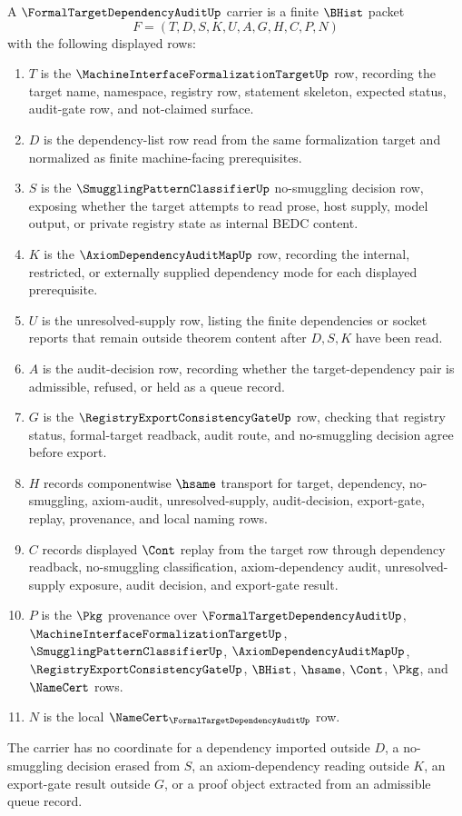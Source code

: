 \begin{definition}
\label{def:formal-target-dependency-audit-carrier}
A $\FormalTargetDependencyAuditUp$ carrier is a finite $\BHist$ packet
$$
F=(T,D,S,K,U,A,G,H,C,P,N)
$$
with the following displayed rows:
\begin{enumerate}
\item $T$ is the $\MachineInterfaceFormalizationTargetUp$ row, recording the target name, namespace, registry row, statement skeleton, expected status, audit-gate row, and not-claimed surface.
\item $D$ is the dependency-list row read from the same formalization target and normalized as finite machine-facing prerequisites.
\item $S$ is the $\SmugglingPatternClassifierUp$ no-smuggling decision row, exposing whether the target attempts to read prose, host supply, model output, or private registry state as internal BEDC content.
\item $K$ is the $\AxiomDependencyAuditMapUp$ row, recording the internal, restricted, or externally supplied dependency mode for each displayed prerequisite.
\item $U$ is the unresolved-supply row, listing the finite dependencies or socket reports that remain outside theorem content after $D,S,K$ have been read.
\item $A$ is the audit-decision row, recording whether the target-dependency pair is admissible, refused, or held as a queue record.
\item $G$ is the $\RegistryExportConsistencyGateUp$ row, checking that registry status, formal-target readback, audit route, and no-smuggling decision agree before export.
\item $H$ records componentwise $\hsame$ transport for target, dependency, no-smuggling, axiom-audit, unresolved-supply, audit-decision, export-gate, replay, provenance, and local naming rows.
\item $C$ records displayed $\Cont$ replay from the target row through dependency readback, no-smuggling classification, axiom-dependency audit, unresolved-supply exposure, audit decision, and export-gate result.
\item $P$ is the $\Pkg$ provenance over $\FormalTargetDependencyAuditUp$, $\MachineInterfaceFormalizationTargetUp$, $\SmugglingPatternClassifierUp$, $\AxiomDependencyAuditMapUp$, $\RegistryExportConsistencyGateUp$, $\BHist$, $\hsame$, $\Cont$, $\Pkg$, and $\NameCert$ rows.
\item $N$ is the local $\NameCert_{\FormalTargetDependencyAuditUp}$ row.
\end{enumerate}
The carrier has no coordinate for a dependency imported outside $D$, a no-smuggling decision erased from $S$, an axiom-dependency reading outside $K$, an export-gate result outside $G$, or a proof object extracted from an admissible queue record.
\end{definition}

